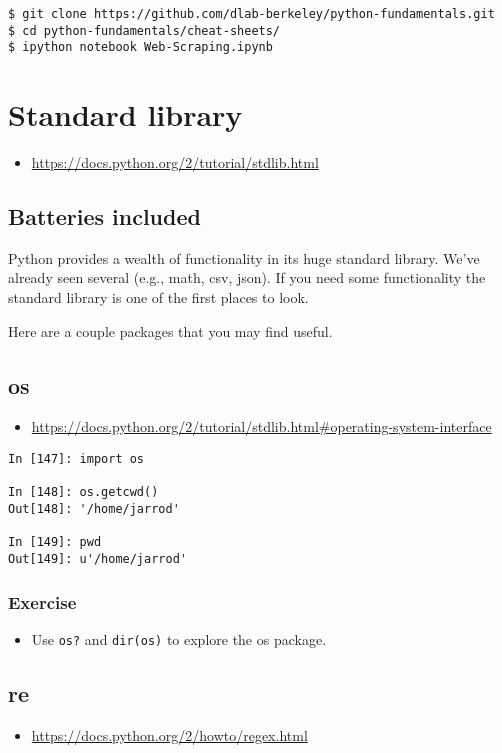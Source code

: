 \begin{verbatim}
$ git clone https://github.com/dlab-berkeley/python-fundamentals.git
$ cd python-fundamentals/cheat-sheets/
$ ipython notebook Web-Scraping.ipynb
\end{verbatim}

\section{Standard library}
\begin{itemize}
\item \url{https://docs.python.org/2/tutorial/stdlib.html}
\end{itemize}

\subsection{Batteries included}
Python provides a wealth of functionality in its huge standard library.
We've already seen several (e.g., math, csv, json). If you need some functionality
the standard library is one of the first places to look.

Here are a couple packages that you may find useful.

\subsection{os}
\begin{itemize}
\item \url{https://docs.python.org/2/tutorial/stdlib.html#operating-system-interface}
\end{itemize}

\begin{verbatim}
In [147]: import os

In [148]: os.getcwd()
Out[148]: '/home/jarrod'

In [149]: pwd
Out[149]: u'/home/jarrod'
\end{verbatim}

\subsubsection{Exercise}
\begin{itemize}
\item Use \texttt{os?} and \texttt{dir(os)} to explore the os package.
\end{itemize}

\subsection{re}
\begin{itemize}
\item \url{https://docs.python.org/2/howto/regex.html}
\end{itemize}


